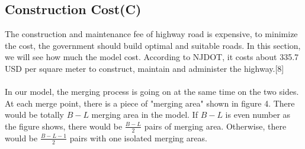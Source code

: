 \subsection{Construction Cost(C)}
The construction and maintenance fee of highway road is expensive, to minimize the cost, the government should build optimal and suitable roads. In this section, we will see how much the model cost. According to NJDOT, it costs about 335.7 USD per square meter to construct, maintain and administer the highway.[8]\\
\\
In our model, the merging process is going on at the same time on the two sides. At each merge point, there is a piece of "merging area" shown in figure 4. There would be totally $B-L$ merging area in the model. If $B-L$ is even number as the figure shows, there would be $\frac{B-L}{2}$ pairs of merging area. Otherwise, there would be $\frac{B-L-1}{2}$ pairs with one isolated merging areas.\\


